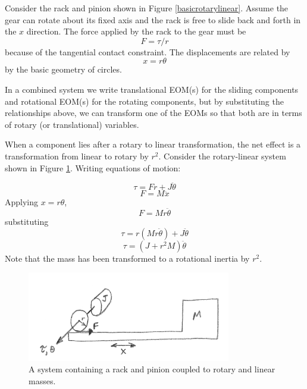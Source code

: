 Consider the rack and pinion shown in Figure \ref{basicrotarylinear}.  Assume the gear can rotate about
its fixed axis and the rack is free to slide back and forth in the $x$ direction.
The force applied by the rack to the gear must be
\[
F = \tau/r
\]
because of the tangential contact constraint.   The displacements are related by
\[
x = r\theta
\]
by the basic geometry of circles.

In a combined system we write translational EOM(s) for the sliding components and rotational EOM(s) for the rotating components, but by substituting the relationships above, we can transform one of the EOMs so that both are in terms of rotary (or translational) variables.

When a component lies after a rotary to linear transformation, the net effect is a transformation from linear to rotary by $r^2$.   Consider the rotary-linear system shown in Figure \ref{rackpinionmasses}. Writing equations of motion:

\[
\tau = Fr + J\ddot{\theta}
\]
\[
F = M\ddot{x}
\]
Applying $x = r\theta$,
\[
F = Mr\ddot{\theta}
\]
substituting
\[
\tau = r(Mr\ddot{\theta}) + J\ddot{\theta}
\]
\[
\tau = (J+r^2M)\ddot{\theta}
\]
Note that the mass has been transformed to a rotational inertia by $r^2$.

\begin{figure}\centering
\includegraphics[width=3.5in]{figs03/00822a.png}
\caption{A system containing a rack and pinion coupled to  rotary and linear masses.}\label{rackpinionmasses}
\end{figure}





